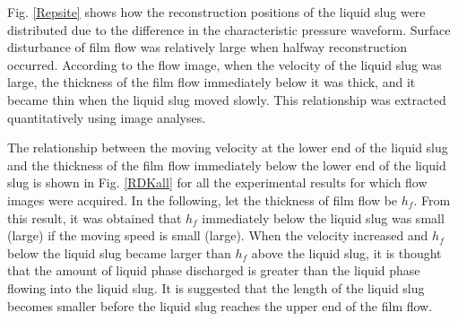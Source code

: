 \documentclass[aps,pre,preprint,groupedaddress,showkeys]{revtex4-2}
\begin{document}
Fig. \ref{Repsite} shows how the reconstruction positions of the liquid slug were distributed due to the difference in the characteristic pressure waveform.
Surface disturbance of film flow was relatively large when halfway reconstruction occurred.
According to the flow image, when the velocity of the liquid slug was large, the thickness of the film flow immediately below it was thick, and it became thin when the liquid slug moved slowly.
This relationship was extracted quantitatively using image analyses.

The relationship between the moving velocity at the lower end of the liquid slug and the thickness of the film flow immediately below the lower end of the liquid slug is shown in Fig. \ref{RDKall} for all the experimental results for which flow images were acquired.
In the following, let the thickness of film flow be $h_f$.
From this result, it was obtained that $h_f$ immediately below the liquid slug was small (large) if the moving speed is small (large).
When the velocity increased and $h_f$ below the liquid slug became larger than $h_f$ above the liquid slug, it is thought that the amount of liquid phase discharged is greater than the liquid phase flowing into the liquid slug.
It is suggested that the length of the liquid slug becomes smaller before the liquid slug reaches the upper end of the film flow.
\end{document}
